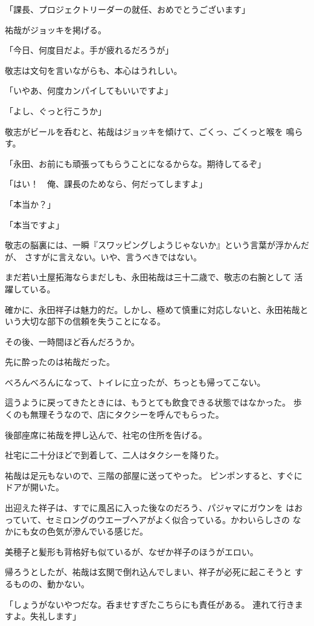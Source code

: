 ﻿\documentclass[
    book,tate,
    line_length=30zw,
    jafontsize=12pt,
    paper=b5j,
    landscape,
    ]{jlreq}
\begin{document}
「課長、プロジェクトリーダーの就任、おめでとうございます」

祐哉がジョッキを掲げる。

「今日、何度目だよ。手が疲れるだろうが」

敬志は文句を言いながらも、本心はうれしい。

「いやあ、何度カンパイしてもいいですよ」

「よし、ぐっと行こうか」

敬志がビールを呑むと、祐哉はジョッキを傾けて、ごくっ、ごくっと喉を
鳴らす。

「永田、お前にも頑張ってもらうことになるからな。期待してるぞ」

「はい！　俺、課長のためなら、何だってしますよ」

「本当か？」

「本当ですよ」

敬志の脳裏には、一瞬『スワッピングしようじゃないか』という言葉が浮かんだが、
さすがに言えない。いや、言うべきではない。

まだ若い土屋拓海ならまだしも、永田祐哉は三十二歳で、敬志の右腕として
活躍している。

確かに、永田祥子は魅力的だ。しかし、極めて慎重に対応しないと、永田祐哉と
いう大切な部下の信頼を失うことになる。

その後、一時間ほど呑んだろうか。

先に酔ったのは祐哉だった。

べろんべろんになって、トイレに立ったが、ちっとも帰ってこない。

這うように戻ってきたときには、もうとても飲食できる状態ではなかった。
歩くのも無理そうなので、店にタクシーを呼んでもらった。

後部座席に祐哉を押し込んで、社宅の住所を告げる。

社宅に二十分ほどで到着して、二人はタクシーを降りた。

祐哉は足元もないので、三階の部屋に送ってやった。
ピンポンすると、すぐにドアが開いた。

出迎えた祥子は、すでに風呂に入った後なのだろう、パジャマにガウンを
はおっていて、セミロングのウエーブヘアがよく似合っている。かわいらしさの
なかにも女の色気が滲んでいる感じだ。

美穂子と髪形も背格好も似ているが、なぜか祥子のほうがエロい。

帰ろうとしたが、祐哉は玄関で倒れ込んでしまい、祥子が必死に起こそうと
するものの、動かない。

「しょうがないやつだな。呑ませすぎたこちらにも責任がある。
連れて行きますよ。失礼します」
\end{document}
